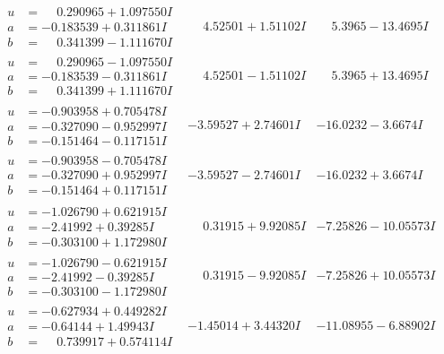 \documentclass[1p]{elsarticle_modified}
\theoremstyle{definition}
\begin{document}
$$\begin{array}{c|c|c}
\begin{aligned}
u &= \phantom{-}0.290965 + 1.097550 I \\
a &= -0.183539 + 0.311861 I \\
b &= \phantom{-}0.341399 - 1.111670 I\end{aligned}
 & \phantom{-}4.52501 + 1.51102 I & \phantom{-}5.3965 - 13.4695 I \\ \hline\begin{aligned}
u &= \phantom{-}0.290965 - 1.097550 I \\
a &= -0.183539 - 0.311861 I \\
b &= \phantom{-}0.341399 + 1.111670 I\end{aligned}
 & \phantom{-}4.52501 - 1.51102 I & \phantom{-}5.3965 + 13.4695 I \\ \hline\begin{aligned}
u &= -0.903958 + 0.705478 I \\
a &= -0.327090 - 0.952997 I \\
b &= -0.151464 - 0.117151 I\end{aligned}
 & -3.59527 + 2.74601 I & -16.0232 - 3.6674 I \\ \hline\begin{aligned}
u &= -0.903958 - 0.705478 I \\
a &= -0.327090 + 0.952997 I \\
b &= -0.151464 + 0.117151 I\end{aligned}
 & -3.59527 - 2.74601 I & -16.0232 + 3.6674 I \\ \hline\begin{aligned}
u &= -1.026790 + 0.621915 I \\
a &= -2.41992 + 0.39285 I \\
b &= -0.303100 + 1.172980 I\end{aligned}
 & \phantom{-}0.31915 + 9.92085 I & -7.25826 - 10.05573 I \\ \hline\begin{aligned}
u &= -1.026790 - 0.621915 I \\
a &= -2.41992 - 0.39285 I \\
b &= -0.303100 - 1.172980 I\end{aligned}
 & \phantom{-}0.31915 - 9.92085 I & -7.25826 + 10.05573 I \\ \hline\begin{aligned}
u &= -0.627934 + 0.449282 I \\
a &= -0.64144 + 1.49943 I \\
b &= \phantom{-}0.739917 + 0.574114 I\end{aligned}
 & -1.45014 + 3.44320 I & -11.08955 - 6.88902 I \\ \hline\begin{aligned}

\end{aligned}
\end{array}$$
\end{document}
